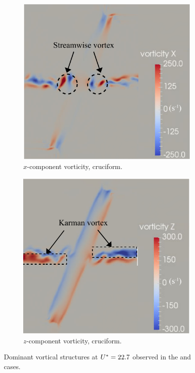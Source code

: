 \documentclass[oneside]{utmthesis}
\begin{document}
\begin{figure}
  \centering
  \begin{subfigure}[h]{0.6\textwidth}
    \centering
    \includegraphics[width=\textwidth]{figs/vorx675}
    \caption{$x$-component vorticity, \angfo{} cruciform.}
    \label{fig:vorx675}
  \end{subfigure}

  \begin{subfigure}[h]{0.6\textwidth}
    \centering
    \includegraphics[width=\textwidth]{figs/vorz675}
    \caption{$z$-component vorticity, \angfo{} cruciform.}
    \label{fig:vorz675}
  \end{subfigure}
  \caption{Dominant vortical structures at $U^{*} = 22.7$ observed in the \angfo{} and \angth{} cases.}
\end{figure}
\end{document}
